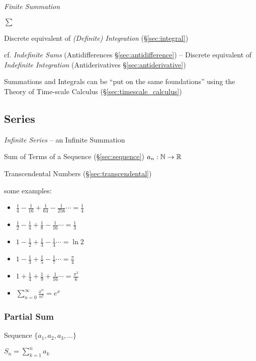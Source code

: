 \emph{Finite Summation}

$\sum$

Discrete equivalent of \emph{(Definite) Integration} (\S\ref{sec:integral})

\fist cf. \emph{Indefinite Sums} (Antidifferences \S\ref{sec:antidifference}) --
Discrete equivalent of \emph{Indefinite Integration} (Antiderivatives
\S\ref{sec:antiderivative})

Summations and Integrals can be ``put on the same foundations'' using the Theory
of Time-scale Calculus (\S\ref{sec:timescale_calculus})



\subsection{Series}\label{sec:series}

\emph{Infinite Series} -- an Infinite Summation

Sum of Terms of a Sequence (\S\ref{sec:sequence}) $a_n : \mathbb{N}
\rightarrow \mathbb{R}$

Transcendental Numbers (\S\ref{sec:transcendental})

some examples:
\begin{itemize}
  \item $\frac{1}{4} - \frac{1}{16} + \frac{1}{64} - \frac{1}{256} \cdots
    = \frac{1}{4}$
  \item $\frac{1}{2} - \frac{1}{4} + \frac{1}{8} - \frac{1}{16} \cdots
    = \frac{1}{3}$
  \item $1 - \frac{1}{2} + \frac{1}{3} - \frac{1}{4} \cdots  = \ln{2}$
  \item $1 - \frac{1}{3} + \frac{1}{5} - \frac{1}{7} \cdots  = \frac{\pi}{4}$
  \item $1 + \frac{1}{4} + \frac{1}{9} + \frac{1}{16} \cdots = \frac{\pi^2}{6}$
  \item $\sum_{n=0}^\infty \frac{x^n}{n!} = e^x$
\end{itemize}



\subsubsection{Partial Sum}\label{sec:partial_sum}

Sequence $\{ a_1, a_2, a_3, \ldots \}$

$S_n = \sum_{k=1}^n a_k$



